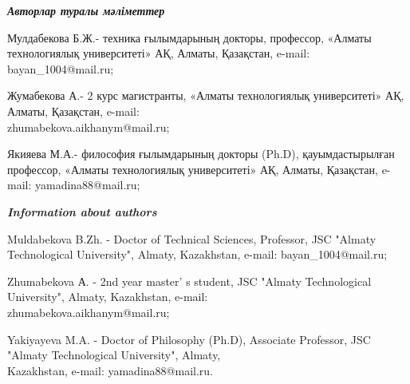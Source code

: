 \begin{authorinfo}
\emph{{\bfseries Авторлар туралы мәліметтер}}

Мулдабекова Б.Ж.- техника ғылымдарының докторы, профессор, «Алматы
технологиялық университеті» АҚ, Алматы, Қазақстан, e-mail: bayan\_1004@mail.ru;

Жумабекова А.- 2 курс магистранты, «Алматы технологиялық университеті»
АҚ, Алматы, Қазақстан, e-mail: \\zhumabekova.aikhanym@mail.ru;

Якияева М.А.- философия ғылымдарының докторы (Ph.D), қауымдастырылған
профессор, «Алматы технологиялық университеті» АҚ, Алматы, Қазақстан, e-mail:
yamadina88@mail.ru;

\emph{{\bfseries Information about authors}}

Muldabekova B.Zh. - Doctor of Technical Sciences, Professor, JSC "Almaty
Technological University", Almaty, Kazakhstan, e-mail:
bayan\_1004@mail.ru;

Zhumabekova А. - 2nd year master' s student, JSC "Almaty
Technological University", Almaty, Kazakhstan, e-mail:\\
zhumabekova.aikhanym@mail.ru;

Yakiyayeva M.A. - Doctor of Philosophy (Ph.D), Associate Professor, JSC
"Almaty Technological University", Almaty, \\Kazakhstan, e-mail:
yamadina88@mail.ru.
\end{authorinfo}
